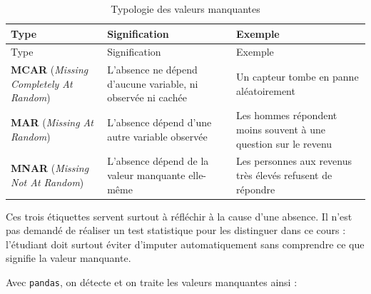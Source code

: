 \documentclass[
  french,
  letterpaper,
  open=any]{scrbook}
\theoremstyle{definition}
\theoremstyle{definition}
\theoremstyle{remark}
\begin{document}
\begin{longtable}[]{@{}
  >{\raggedright\arraybackslash}p{}
  >{\raggedright\arraybackslash}p{}
  >{\raggedright\arraybackslash}p{}@{}}
\caption{Typologie des valeurs
manquantes}\label{tbl-typologie-manquantes}\tabularnewline
\toprule\noalign{}
\begin{minipage}[b]{\linewidth}\raggedright
Type
\end{minipage} & \begin{minipage}[b]{\linewidth}\raggedright
Signification
\end{minipage} & \begin{minipage}[b]{\linewidth}\raggedright
Exemple
\end{minipage} \\
\midrule\noalign{}
\endfirsthead
\toprule\noalign{}
\begin{minipage}[b]{\linewidth}\raggedright
Type
\end{minipage} & \begin{minipage}[b]{\linewidth}\raggedright
Signification
\end{minipage} & \begin{minipage}[b]{\linewidth}\raggedright
Exemple
\end{minipage} \\
\midrule\noalign{}
\endhead
\bottomrule\noalign{}
\endlastfoot
\textbf{MCAR} (\emph{Missing Completely At Random}) & L'absence ne
dépend d'aucune variable, ni observée ni cachée & Un capteur tombe en
panne aléatoirement \\
\textbf{MAR} (\emph{Missing At Random}) & L'absence dépend d'une autre
variable observée & Les hommes répondent moins souvent à une question
sur le revenu \\
\textbf{MNAR} (\emph{Missing Not At Random}) & L'absence dépend de la
valeur manquante elle-même & Les personnes aux revenus très élevés
refusent de répondre \\
\end{longtable}

Ces trois étiquettes servent surtout à réfléchir à la cause d'une
absence. Il n'est pas demandé de réaliser un test statistique pour les
distinguer dans ce cours : l'étudiant doit surtout éviter d'imputer
automatiquement sans comprendre ce que signifie la valeur manquante.

Avec \texttt{pandas}, on détecte et on traite les valeurs manquantes
ainsi :
\end{document}

